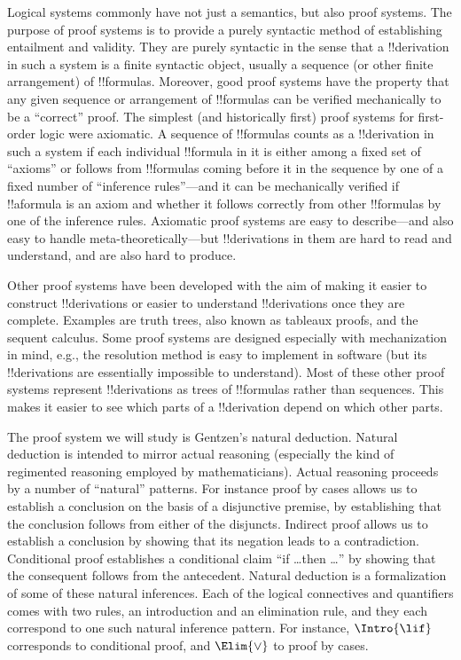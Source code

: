 \documentclass[../../../include/open-logic-section]{subfiles}
\begin{document}


Logical systems commonly have not just a semantics, but also proof
systems. The purpose of proof systems is to provide a purely syntactic
method of establishing entailment and validity.  They are purely
syntactic in the sense that a !!{derivation} in such a system is a
finite syntactic object, usually a sequence (or other finite
arrangement) of !!{formula}s.  Moreover, good proof systems have the
property that any given sequence or arrangement of !!{formula}s can be
verified mechanically to be a ``correct'' proof.  The simplest (and
historically first) proof systems for first-order logic were
axiomatic.  A sequence of !!{formula}s counts as a !!{derivation} in
such a system if each individual !!{formula} in it is either among a
fixed set of ``axioms'' or follows from !!{formula}s coming before it
in the sequence by one of a fixed number of ``inference rules''---and
it can be mechanically verified if !!a{formula} is an axiom and
whether it follows correctly from other !!{formula}s by one of the
inference rules.  Axiomatic proof systems are easy to describe---and
also easy to handle meta-theoretically---but !!{derivation}s in them are
hard to read and understand, and are also hard to produce.

Other proof systems have been developed with the aim of making it
easier to construct !!{derivation}s or easier to understand
!!{derivation}s once they are complete.  Examples are truth trees,
also known as tableaux proofs, and the sequent calculus.  Some proof
systems are designed especially with mechanization in mind, e.g., the
resolution method is easy to implement in software (but its
!!{derivation}s are essentially impossible to understand). Most of
these other proof systems represent !!{derivation}s as trees of
!!{formula}s rather than sequences. This makes it easier to see which
parts of a !!{derivation} depend on which other parts.

The proof system we will study is Gentzen's natural deduction. Natural
deduction is intended to mirror actual reasoning (especially the kind
of regimented reasoning employed by mathematicians).  Actual reasoning
proceeds by a number of ``natural'' patterns. For instance proof by
cases allows us to establish a conclusion on the basis of a
disjunctive premise, by establishing that the conclusion follows from
either of the disjuncts. Indirect proof allows us to establish a
conclusion by showing that its negation leads to a
contradiction. Conditional proof establishes a conditional claim ``if
\dots then \dots'' by showing that the consequent follows from the
antecedent.  Natural deduction is a formalization of some of these
natural inferences.  Each of the logical connectives and quantifiers
comes with two rules, an introduction and an elimination rule, and
they each correspond to one such natural inference pattern. For
instance, $\Intro{\lif}$ corresponds to conditional proof, and
$\Elim{\lor}$ to proof by cases.
\end{document}
